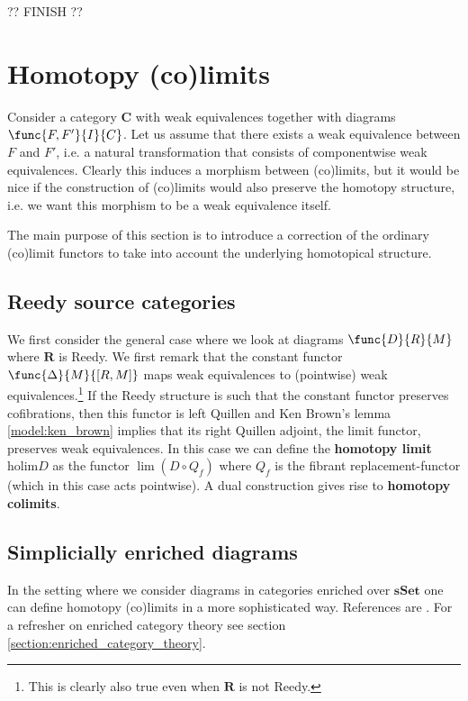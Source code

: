    ?? FINISH ??

\section{Homotopy (co)limits}

    Consider a category $\mathbf{C}$ with weak equivalences together with diagrams $\func{F, F'}{I}{C}$. Let us assume that there exists a weak equivalence between $F$ and $F'$, i.e. a natural transformation that consists of componentwise weak equivalences. Clearly this induces a morphism between (co)limits, but it would be nice if the construction of (co)limits would also preserve the homotopy structure, i.e. we want this morphism to be a weak equivalence itself.

    The main purpose of this section is to introduce a correction of the ordinary (co)limit functors to take into account the underlying homotopical structure.

\subsection{Reedy source categories}

    We first consider the general case where we look at diagrams $\func{D}{R}{M}$ where $\mathbf{R}$ is Reedy. We first remark that the constant functor $\func{\Delta}{M}{[R, M]}$ maps weak equivalences to (pointwise) weak equivalences.\footnote{This is clearly also true even when $\mathbf{R}$ is not Reedy.} If the Reedy structure is such that the constant functor preserves cofibrations, then this functor is left Quillen and Ken Brown's lemma \ref{model:ken_brown} implies that its right Quillen adjoint, the limit functor, preserves weak equivalences. In this case we can define the \textbf{homotopy limit} $\text{holim} D$ as the functor $\lim(D\circ Q_f)$ where $Q_f$ is the fibrant replacement-functor (which in this case acts pointwise). A dual construction gives rise to \textbf{homotopy colimits}.

\subsection{Simplicially enriched diagrams}

    In the setting where we consider diagrams in categories enriched over $\mathbf{sSet}$ one can define homotopy (co)limits in a more sophisticated way. References are \cite{hocolim_riehl}. For a refresher on enriched category theory see section \ref{section:enriched_category_theory}.

